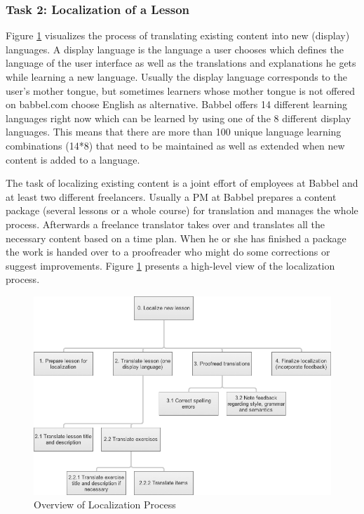 \subsubsection{Task 2: Localization of a Lesson} \label{sec:task-localization}
Figure \ref{fig:loc-overview} visualizes the process of translating existing content into new (display) languages. A display language is the language a user chooses which defines the language of the user interface as well as the translations and explanations he gets while learning a new language. Usually the display language corresponds to the user’s mother tongue, but sometimes learners whose mother tongue is not offered on babbel.com choose English as alternative. Babbel offers 14 different learning languages right now which can be learned by using one of the 8 different display languages. This means that there are more than 100 unique language learning combinations (14*8) that need to be maintained as well as extended when new content is added to a language.

The task of localizing existing content is a joint effort of employees at Babbel and at least two different freelancers. Usually a \ac{PM} at Babbel prepares a content package (several lessons or a whole course) for translation and manages the whole process. Afterwards a freelance translator takes over and translates all the necessary content based on a time plan. When he or she has finished a package the work is handed over to a proofreader who might do some corrections or suggest improvements. Figure \ref{fig:loc-overview} presents a high-level view of the localization process.

\begin{figure}[h]
 \centering
 \includegraphics[width=12cm]{images/task-analysis/localize_lesson}
 \caption{Overview of Localization Process}
 \label{fig:loc-overview}
\end{figure}

